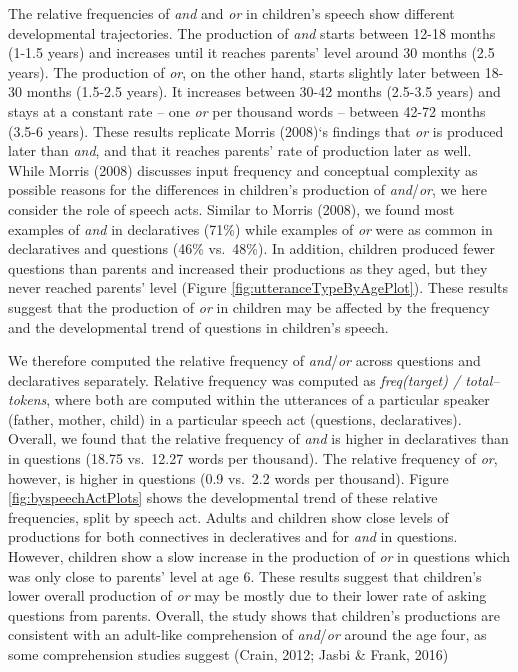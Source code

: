 \documentclass[10pt, letterpaper]{article}
\begin{document}
The relative frequencies of \emph{and} and \emph{or} in children's
speech show different developmental trajectories. The production of
\emph{and} starts between 12-18 months (1-1.5 years) and increases until
it reaches parents' level around 30 months (2.5 years). The production
of \emph{or}, on the other hand, starts slightly later between 18-30
months (1.5-2.5 years). It increases between 30-42 months (2.5-3.5
years) and stays at a constant rate -- one \emph{or} per thousand words
-- between 42-72 months (3.5-6 years). These results replicate Morris
(2008)`s findings that \emph{or} is produced later than \emph{and}, and
that it reaches parents' rate of production later as well. While Morris
(2008) discusses input frequency and conceptual complexity as possible
reasons for the differences in children's production of
\emph{and}/\emph{or}, we here consider the role of speech acts. Similar
to Morris (2008), we found most examples of \emph{and} in declaratives
(71\%) while examples of \emph{or} were as common in declaratives and
questions (46\% vs.~48\%). In addition, children produced fewer
questions than parents and increased their productions as they aged, but
they never reached parents' level (Figure
\ref{fig:utteranceTypeByAgePlot}). These results suggest that the
production of \emph{or} in children may be affected by the frequency and
the developmental trend of questions in children's speech.

We therefore computed the relative frequency of \emph{and}/\emph{or}
across questions and declaratives separately. Relative frequency was
computed as \emph{freq(target) / total--tokens}, where both are computed
within the utterances of a particular speaker (father, mother, child) in
a particular speech act (questions, declaratives). Overall, we found
that the relative frequency of \emph{and} is higher in declaratives than
in questions (18.75 vs.~12.27 words per thousand). The relative
frequency of \emph{or}, however, is higher in questions (0.9 vs.~2.2
words per thousand). Figure \ref{fig:byspeechActPlots} shows the
developmental trend of these relative frequencies, split by speech act.
Adults and children show close levels of productions for both
connectives in decleratives and for \emph{and} in questions. However,
children show a slow increase in the production of \emph{or} in
questions which was only close to parents' level at age 6. These results
suggest that children's lower overall production of \emph{or} may be
mostly due to their lower rate of asking questions from parents.
Overall, the study shows that children's productions are consistent with
an adult-like comprehension of \emph{and}/\emph{or} around the age four,
as some comprehension studies suggest (Crain, 2012; Jasbi \& Frank,
2016)
\end{document}
